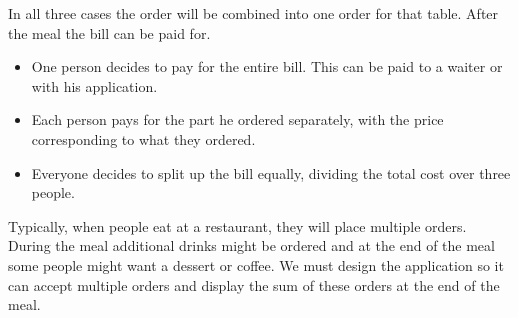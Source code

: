 \documentclass[12pt]{article}
\begin{document}
\begin{multicols}{2}
\noindent 
In all three cases the order will be combined into one order for that table. After the meal the bill can be paid for.

\begin{itemize}
	\raggedright
	\item One person decides to pay for the entire bill. This can be paid to a waiter or with his application.
	\item Each person pays for the part he ordered separately, with the price corresponding to what they ordered.
	\item Everyone decides to split up the bill equally, dividing the total cost over three people. 
\end{itemize}

\noindent
Typically, when people eat at a restaurant, they will place multiple orders. During the meal additional drinks might be ordered and at the end of the meal some people might want a dessert or coffee. We must design the application so it can accept multiple orders and display the sum of these orders at the end of the meal.



\end{multicols}
\end{document}
